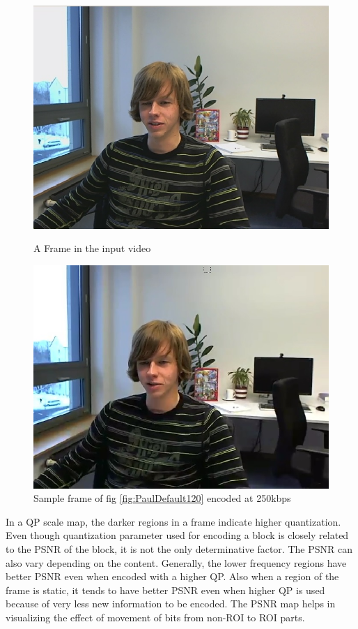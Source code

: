 \documentclass[11pt]{article} %
\begin{document}
\begin{figure}[!h]
    \centering
    \includegraphics[scale=0.5]{PaulDefault120}
    \caption{A Frame in the input video}
    \label{fig:PaulDefault120}
    \includegraphics[scale=0.5]{PaulDefault120_91250kbps}
    \caption{Sample frame of fig \ref{fig:PaulDefault120} encoded at 250kbps}
    \label{fig:PaulDefaultencoded}
\end{figure} 

In a QP scale map, the darker regions in a frame indicate higher quantization. Even though quantization parameter used for encoding a block is closely related to the PSNR of the block, it is not the only determinative factor. The PSNR can also vary depending on the content. Generally, the lower frequency regions have better PSNR even when encoded with a higher QP. Also when a region of the frame is static, it tends to have better PSNR even when higher QP is used because of very less new information to be encoded. The PSNR map helps in visualizing the effect of movement of bits from non-ROI to ROI parts.
\end{document}
